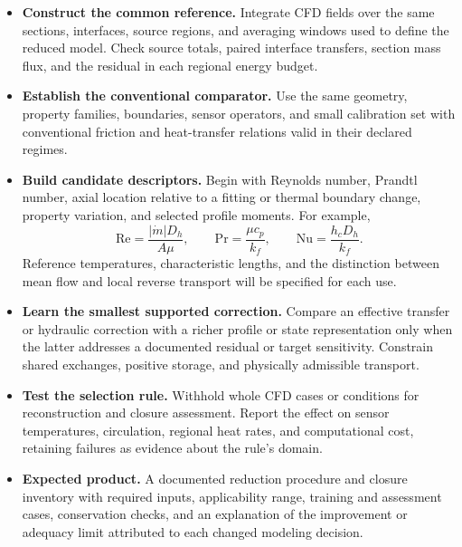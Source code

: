 \begin{itemize}[leftmargin=*]
\item \textbf{Construct the common reference.} Integrate CFD fields over the same sections, interfaces, source regions, and averaging windows used to define the reduced model. Check source totals, paired interface transfers, section mass flux, and the residual in each regional energy budget.
\item \textbf{Establish the conventional comparator.} Use the same geometry, property families, boundaries, sensor operators, and small calibration set with conventional friction and heat-transfer relations valid in their declared regimes.
\item \textbf{Build candidate descriptors.} Begin with Reynolds number, Prandtl number, axial location relative to a fitting or thermal boundary change, property variation, and selected profile moments. For example,
\begin{equation}
\mathrm{Re}=\frac{|\dot m|D_h}{A\mu},\qquad
\mathrm{Pr}=\frac{\mu c_p}{k_f},\qquad
\mathrm{Nu}=\frac{h_cD_h}{k_f}.
\label{eq:closure-descriptors}
\end{equation}
Reference temperatures, characteristic lengths, and the distinction between mean flow and local reverse transport will be specified for each use.
\item \textbf{Learn the smallest supported correction.} Compare an effective transfer or hydraulic correction with a richer profile or state representation only when the latter addresses a documented residual or target sensitivity. Constrain shared exchanges, positive storage, and physically admissible transport.
\item \textbf{Test the selection rule.} Withhold whole CFD cases or conditions for reconstruction and closure assessment. Report the effect on sensor temperatures, circulation, regional heat rates, and computational cost, retaining failures as evidence about the rule's domain.
\item \textbf{Expected product.} A documented reduction procedure and closure inventory with required inputs, applicability range, training and assessment cases, conservation checks, and an explanation of the improvement or adequacy limit attributed to each changed modeling decision.
\end{itemize}


